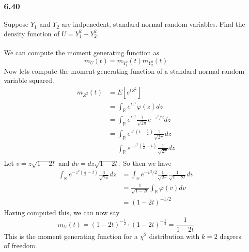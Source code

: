 \documentclass{article}
\theoremstyle{definition}
\begin{document}
\subsubsection*{6.40}
Suppose $Y_1$ and $Y_2$ are indpenedent, standard normal random variables. Find the density
function of $U = Y_1^2 + Y_2^2$.\\\\
We can compute the moment generating function as 
\[
    m_U(t) = m_{Y_1^2}(t) m_{Y_2^2}(t)
\]
Now lets compute the moment-generating function of a standard normal random variable squared.
\begin{align*}
    m_{Z^2}(t) &= E[e^{tZ^2}]\\
    &= \int_\mathbb{R} e^{tz^2}  \varphi (z) dz\\
    &= \int_\mathbb{R} e^{tz^2}  \frac{1}{\sqrt{2\pi}} e^{-z^2 / 2} dz \\
    &= \int_\mathbb{R} e^{z^2 (t - \frac{1}{2})} \frac{1}{\sqrt{2\pi}} dz \\
    &= \int_\mathbb{R} e^{-z^2 (\frac{1}{2} - t)} \frac{1}{\sqrt{2\pi}} dz \\
\end{align*}
Let $v = z\sqrt{1 - 2t}$ and $dv = dz\sqrt{1-2t}$. So then we have 
\begin{align*}
    \int_\mathbb{R} e^{-z^2 (\frac{1}{2} - t)} \frac{1}{\sqrt{2\pi}} dz &= \int_\mathbb{R} e^{-v^2 / 2} \frac{1}{\sqrt{2\pi}} \frac{1}{\sqrt{1-2t}} dv\\
    &= \frac{1}{\sqrt{1 - 2t}} \int_\mathbb{R} \varphi (v) dv \\
    &= (1-2t)^{-1 / 2}
\end{align*}
Having computed this, we can now say
\[
    m_U(t) = (1-2t)^{-\frac{1}{2}} \cdot (1-2t)^{-\frac{1}{2}} = \frac{1}{1-2t}
\]
This is the moment generating function for a $\chi^2$ distribution with $k = 2$ degrees of freedom.
\subsubsection*{}
\end{document}
